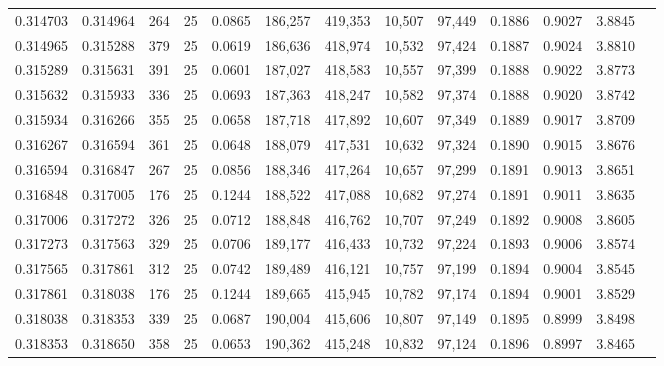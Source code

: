 \begin{tabular}{rrrrrrrrrrrrr}
0.314703 & 0.314964 &   264 &  25 &                                     0.0865 & 186,257 & 419,353 &  10,507 &  97,449 & 0.1886 & 0.9027 & 3.8845 \\
0.314965 & 0.315288 &   379 &  25 &                                     0.0619 & 186,636 & 418,974 &  10,532 &  97,424 & 0.1887 & 0.9024 & 3.8810 \\
0.315289 & 0.315631 &   391 &  25 &                                     0.0601 & 187,027 & 418,583 &  10,557 &  97,399 & 0.1888 & 0.9022 & 3.8773 \\
0.315632 & 0.315933 &   336 &  25 &                                     0.0693 & 187,363 & 418,247 &  10,582 &  97,374 & 0.1888 & 0.9020 & 3.8742 \\
0.315934 & 0.316266 &   355 &  25 &                                     0.0658 & 187,718 & 417,892 &  10,607 &  97,349 & 0.1889 & 0.9017 & 3.8709 \\
0.316267 & 0.316594 &   361 &  25 &                                     0.0648 & 188,079 & 417,531 &  10,632 &  97,324 & 0.1890 & 0.9015 & 3.8676 \\
0.316594 & 0.316847 &   267 &  25 &                                     0.0856 & 188,346 & 417,264 &  10,657 &  97,299 & 0.1891 & 0.9013 & 3.8651 \\
0.316848 & 0.317005 &   176 &  25 &                                     0.1244 & 188,522 & 417,088 &  10,682 &  97,274 & 0.1891 & 0.9011 & 3.8635 \\
0.317006 & 0.317272 &   326 &  25 &                                     0.0712 & 188,848 & 416,762 &  10,707 &  97,249 & 0.1892 & 0.9008 & 3.8605 \\
0.317273 & 0.317563 &   329 &  25 &                                     0.0706 & 189,177 & 416,433 &  10,732 &  97,224 & 0.1893 & 0.9006 & 3.8574 \\
0.317565 & 0.317861 &   312 &  25 &                                     0.0742 & 189,489 & 416,121 &  10,757 &  97,199 & 0.1894 & 0.9004 & 3.8545 \\
0.317861 & 0.318038 &   176 &  25 &                                     0.1244 & 189,665 & 415,945 &  10,782 &  97,174 & 0.1894 & 0.9001 & 3.8529 \\
0.318038 & 0.318353 &   339 &  25 &                                     0.0687 & 190,004 & 415,606 &  10,807 &  97,149 & 0.1895 & 0.8999 & 3.8498 \\
0.318353 & 0.318650 &   358 &  25 &                                     0.0653 & 190,362 & 415,248 &  10,832 &  97,124 & 0.1896 & 0.8997 & 3.8465 \\

\end{tabular}
